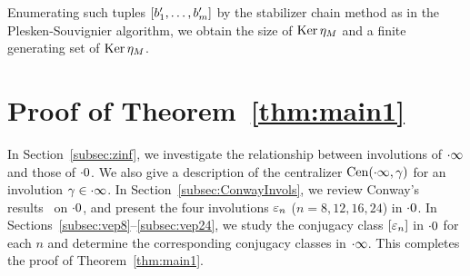 \documentclass{amsart} %
\begin{document}
Enumerating such tuples $[b_1^{\prime}, \dots, b_{m}^{\prime}]$
by the stabilizer chain method as in the Plesken-Souvignier algorithm, 
we obtain the size of $\operatorname{Ker} \eta_M$
and a finite generating set of $\operatorname{Ker} \eta_M$.
%
%
%
\section{Proof of Theorem~\ref{thm:main1}}\label{sec:proofofmain1}
%
In Section~\ref{subsec:zinf}, 
we investigate the relationship between involutions of $\cdot \infty$ and those of $\cdot 0$.
We also give a description of the centralizer $\mathrm{Cen}(\cdot \infty, \gamma)$
for an involution $\gamma\in \cdot \infty$.
In Section~\ref{subsec:ConwayInvols}, 
we review Conway's results~\cite[Chapter 10]{theCSbook} on $\cdot 0$, 
and present the four involutions $\varepsilon_n$ ($n=8,12,16,24$) 
 in $\cdot 0$.
In Sections~\ref{subsec:vep8}--\ref{subsec:vep24}, 
we study the conjugacy class $[\varepsilon_n]$ in $\cdot 0$ for each $n$ 
and determine the corresponding conjugacy classes in $\cdot \infty$. This completes the proof of Theorem~\ref{thm:main1}.
%
%
\end{document}
